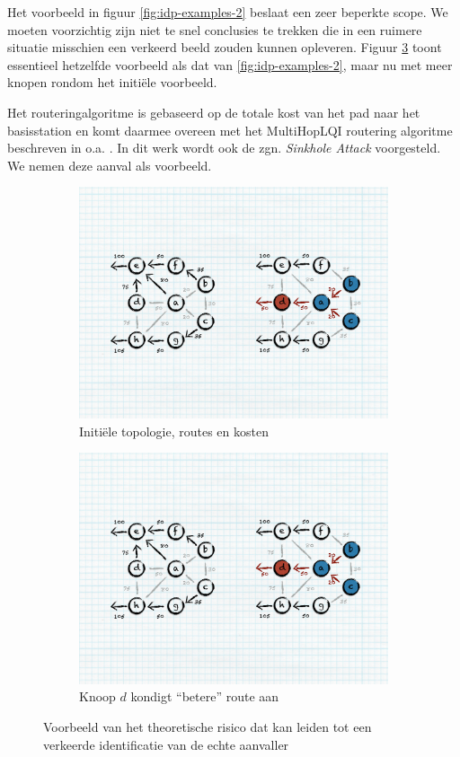Het voorbeeld in figuur \ref{fig:idp-examples-2} beslaat een zeer beperkte
scope. We moeten voorzichtig zijn niet te snel conclusies te trekken die in een
ruimere situatie misschien een verkeerd beeld zouden kunnen opleveren. Figuur
\ref{fig:sinkhole-ripple} toont essentieel hetzelfde voorbeeld als dat van
\ref{fig:idp-examples-2}, maar nu met meer knopen rondom het initi\"ele
voorbeeld.

Het routeringalgoritme is gebaseerd op de totale kost van het pad naar het
basisstation en komt daarmee overeen met het MultiHopLQI routering algoritme
beschreven in o.a. \citep{krontiris2008launching}. In dit werk wordt ook de
zgn. \emph{Sinkhole Attack} voorgesteld. We nemen deze aanval als voorbeeld.

\begin{figure}[ht]
\centering
\begin{subfigure}{.49\textwidth}
  \centering
  \includegraphics[width=.8\linewidth]{./resources/sinkhole-before.pdf}
  \caption{Initi\"ele topologie, routes en kosten}
  \label{fig:sinkhole-ripple-1}
\end{subfigure}
\begin{subfigure}{.49\textwidth}
  \centering
  \includegraphics[width=.8\linewidth]{./resources/sinkhole-after.pdf}
  \caption{Knoop $d$ kondigt ``betere'' route aan}
  \label{fig:sinkhole-ripple-2}
\end{subfigure}
\caption{Voorbeeld van het theoretische risico dat kan leiden tot een verkeerde
identificatie van de echte aanvaller}
\label{fig:sinkhole-ripple}
\end{figure}


